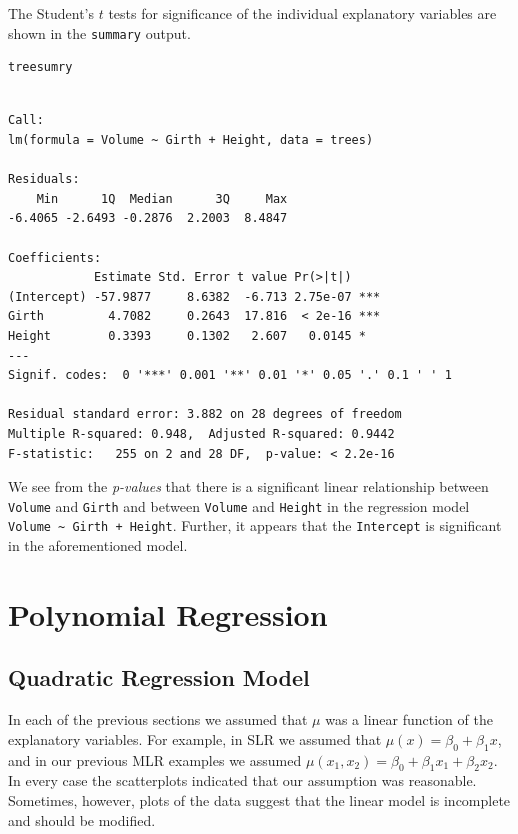 \documentclass[captions=tableheading]{scrbook}
\begin{document}
The Student's \(t\) tests for significance of the individual explanatory variables are shown in the \texttt{summary} output.


\lstset{language=R}
\begin{lstlisting}
treesumry
\end{lstlisting}


\begin{verbatim}

Call:
lm(formula = Volume ~ Girth + Height, data = trees)

Residuals:
    Min      1Q  Median      3Q     Max 
-6.4065 -2.6493 -0.2876  2.2003  8.4847 

Coefficients:
            Estimate Std. Error t value Pr(>|t|)    
(Intercept) -57.9877     8.6382  -6.713 2.75e-07 ***
Girth         4.7082     0.2643  17.816  < 2e-16 ***
Height        0.3393     0.1302   2.607   0.0145 *  
---
Signif. codes:  0 '***' 0.001 '**' 0.01 '*' 0.05 '.' 0.1 ' ' 1 

Residual standard error: 3.882 on 28 degrees of freedom
Multiple R-squared: 0.948,	Adjusted R-squared: 0.9442 
F-statistic:   255 on 2 and 28 DF,  p-value: < 2.2e-16
\end{verbatim}

We see from the \emph{p-values} that there is a significant linear relationship between \texttt{Volume} and \texttt{Girth} and between \texttt{Volume} and \texttt{Height} in the regression model \texttt{Volume \textasciitilde{} Girth + Height}. Further, it appears that the \texttt{Intercept} is significant in the aforementioned model.
\section{Polynomial Regression}
\label{sec-12-4}
\label{sec-Polynomial-Regression}
\subsection{Quadratic Regression Model}
\label{sec-12-4-1}


In each of the previous sections we assumed that \(\mu\) was a linear function of the explanatory variables. For example, in SLR we assumed that \(\mu(x)=\beta_{0}+\beta_{1}x\), and in our previous MLR examples we assumed \(\mu(x_{1},x_{2})=\beta_{0}+\beta_{1}x_{1}+\beta_{2}x_{2}\). In every case the scatterplots indicated that our assumption was reasonable. Sometimes, however, plots of the data suggest that the linear model is incomplete and should be modified.
\end{document}
